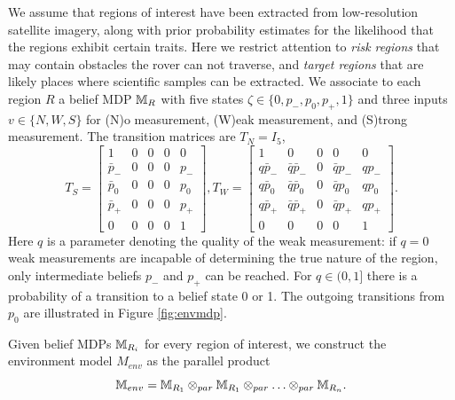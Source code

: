 \documentclass[draft,conference]{IEEEtran}
\begin{document}
We assume that regions of interest have been extracted from low-resolution satellite imagery, along with prior probability estimates for the likelihood that the regions exhibit certain traits. Here we restrict attention to \emph{risk regions} that may contain obstacles the rover can not traverse, and \emph{target regions} that are likely places where scientific samples can be extracted. We associate to each region $R$ a belief MDP $\mathbb{M}_{R}$ with five states $\zeta \in \{ 0, p_-, p_0, p_+, 1\}$ and three inputs $v \in \{ N, W, S \}$ for (N)o measurement, (W)eak measurement, and (S)trong measurement. The transition matrices are $T_N = I_5$, 
\begin{equation}
  T_{S} = \left[\begin{smallmatrix}
    1        &  0  &  0  &  0  &  0   \\
    \bar p_- &  0  &  0  &  0  &  p_- \\
    \bar p_0 &  0  &  0  &  0  &  p_0 \\
    \bar p_+ &  0  &  0  &  0  &  p_+ \\
    0        &  0  &  0  &  0  &  1
  \end{smallmatrix}\right],
  T_{W} = \left[\begin{smallmatrix}
    1        &  0                &  0  &  0           &  0   \\
    q\bar p_-&  \bar q \bar p_-  &  0  &  \bar q p_-  &  q p_- \\
    q\bar p_0&  \bar q \bar p_0  &  0  &  \bar q p_0  &  q p_0 \\
    q\bar p_+&  \bar q \bar p_+  &  0  &  \bar q p_+  &  q p_+ \\
    0        &  0  &  0  &  0  &  1
  \end{smallmatrix}\right].
\end{equation}
Here $q$ is a parameter denoting the quality of the weak measurement: if $q=0$ weak measurements are incapable of determining the true nature of the region, only intermediate beliefs $p_-$ and $p_+$ can be reached. For $q \in (0,1]$ there is a probability of a transition to a belief state 0 or 1. The outgoing transitions from $p_0$ are illustrated in Figure \ref{fig:envmdp}.

Given belief MDPs $\mathbb{M}_{R_i}$ for every region of interest, we construct the environment model $M_{env}$ as the parallel product
\begin{equation}
  \mathbb{M}_{env} = \mathbb{M}_{R_1} \otimes_{par} \mathbb{M}_{R_1}  \otimes_{par} \ldots \otimes_{par} \mathbb{M}_{R_n}. 
\end{equation}
\end{document}
